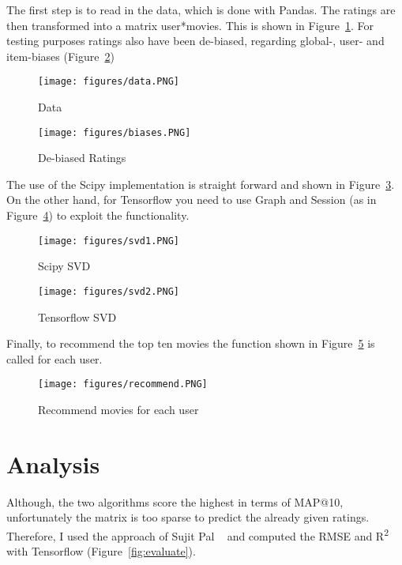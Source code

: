 \documentclass[letterpaper,12pt]{article}
\begin{document}
The first step is to read in the data, which is done with Pandas. The ratings are then transformed into a matrix user*movies. This is shown in Figure~\ref{fig:data}. For testing purposes ratings also have been de-biased, regarding global-, user- and item-biases (Figure~\ref{fig:biases})

\begin{figure}[H] 
  \centering
      \texttt{[image: figures/data.PNG]}
        \caption{
                \label{fig:data}  
                Data
        }
\end{figure}

\begin{figure}[H] 
  \centering
      \texttt{[image: figures/biases.PNG]}
        \caption{
                \label{fig:biases}  
                De-biased Ratings
        }
\end{figure}

The use of the Scipy implementation is straight forward and shown in Figure~\ref{fig:svd1}. On the other hand, for Tensorflow you need to use Graph and Session (as in Figure~\ref{fig:svd2}) to exploit the functionality.

\begin{figure}[H] 
  \centering
      \texttt{[image: figures/svd1.PNG]}
        \caption{
                \label{fig:svd1}  
                Scipy SVD
        }
\end{figure}

\begin{figure}[H] 
  \centering
      \texttt{[image: figures/svd2.PNG]}
        \caption{
                \label{fig:svd2}  
                Tensorflow SVD
        }
\end{figure}

Finally, to recommend the top ten movies the function shown in Figure~\ref{fig:recommend} is called for each user.

\begin{figure}[H] 
  \centering
      \texttt{[image: figures/recommend.PNG]}
        \caption{
                \label{fig:recommend}  
                Recommend movies for each user
        }
\end{figure}


\section{Analysis}
Although, the two algorithms score the highest in terms of MAP@10, unfortunately the matrix is too sparse to predict the already given ratings.
Therefore, I used the approach of Sujit Pal ~\cite{Tensorflow} and computed the RMSE and R\textsuperscript{2} with Tensorflow (Figure~\ref{fig:evaluate}).
\end{document}
